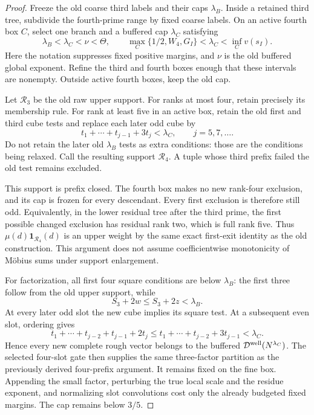 \begin{proof}
Freeze the old coarse third labels and their caps \(\lambda_B\).
Inside a retained third tree, subdivide the fourth-prime range by
fixed coarse labels. On an active fourth box \(C\), select one
branch and a buffered cap \(\lambda_C\) satisfying
\[
 \lambda_B<\lambda_C<\nu<\Theta,\qquad
 \max_C\{1/2,W_4,G_I\}<\lambda_C<\inf_C v(s_I).
\]
Here the notation suppresses fixed positive margins, and
\(\nu\) is the old buffered global exponent. Refine the third and
fourth boxes enough that these intervals are nonempty.
Outside active fourth boxes, keep the old cap.

Let \(\mathcal R_3\) be the old raw upper support.
For ranks at most four, retain precisely its membership rule.
For rank at least five in an active box, retain the old first
and third cube tests and replace each later odd cube by
\[
 t_1+\cdots+t_{j-1}+3t_j<\lambda_C,
       \qquad j=5,7,\ldots.
\]
Do not retain the later old \(\lambda_B\) tests as extra conditions:
those are the conditions being relaxed.
Call the resulting support \(\mathcal R_4\).
A tuple whose third prefix failed the old test remains excluded.

This support is prefix closed. The fourth box makes no new
rank-four exclusion, and its cap is frozen for every descendant.
Every first exclusion is therefore still odd.
Equivalently, in the lower residual tree after the third prime,
the first possible changed exclusion has residual rank two,
which is full rank five. Thus
\(\mu(d)\mathbf1_{\mathcal R_4}(d)\) is an upper weight by the
same exact first-exit identity as the old construction.
This argument does not assume coefficientwise monotonicity of
M\"obius sums under support enlargement.

For factorization, all first four square conditions are below
\(\lambda_B\): the first three follow from the old upper support,
while
\[
 S_3+2w\le S_3+2z<\lambda_B.
\]
At every later odd slot the new cube implies its square test.
At a subsequent even slot, ordering gives
\[
 t_1+\cdots+t_{j-2}+t_{j-1}+2t_j
 \le t_1+\cdots+t_{j-2}+3t_{j-1}<\lambda_C .
\]
Hence every new complete rough vector belongs to the buffered
\(\mathcal D^{\rm well}(N^{\lambda_C})\).
The selected four-slot gate then supplies the same three-factor
partition as the previously derived four-prefix argument.
It remains fixed on the fine box. Appending the small factor,
perturbing the true local scale and the residue exponent, and
normalizing slot convolutions cost only the already budgeted
fixed margins. The cap remains below \(3/5\).


\end{proof}
